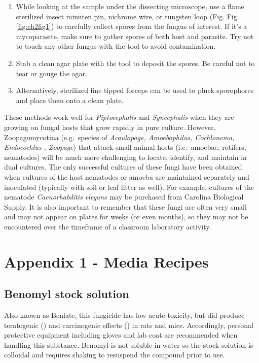 \documentclass[]{book}
\providecommand{\tightlist}{%
  \setlength{\itemsep}{0pt}\setlength{\parskip}{0pt}}
\begin{document}
\begin{enumerate}
\def\labelenumi{\arabic{enumi}.}
\tightlist
\item
  While looking at the sample under the dissecting microscope, use a flame sterilized insect minuten pin, nichrome wire, or tungsten loop (Fig. Fig. \ref{fig:ch2fig1}) to carefully collect spores from the fungus of interest. If it's a mycoparasite, make sure to gather spores of both host and parasite. Try not to touch any other fungus with the tool to avoid contamination.
\item
  Stab a clean agar plate with the tool to deposit the spores. Be careful not to tear or gouge the agar.
\item
  Alternatively, sterilized fine tipped forceps can be used to pluck sporophores and place them onto a clean plate.
\end{enumerate}

These methods work well for \emph{Piptocephalis} and \emph{Syncephalis} when they are growing on fungal hosts that grow rapidly in pure culture. However, Zoopagomycotina (e.g.~species of \emph{Acaulopage, Amoebophilus, Cochlonema, Endocochlus , Zoopage}) that attack small animal hosts (i.e.~amoebae, rotifers, nematodes) will be much more challenging to locate, identify, and maintain in dual cultures. The only successful cultures of these fungi have been obtained when cultures of the host nematodes or amoeba are maintained separately and inoculated (typically with soil or leaf litter as well). For example, cultures of the nematode \emph{Caenorhabditis elegans} may be purchased from Carolina Biological Supply. It is also important to remember that these fungi are often very small and may not appear on plates for weeks (or even months), so they may not be encountered over the timeframe of a classroom laboratory activity.

\hypertarget{appendix-1---media-recipes}{%
\section{Appendix 1 - Media Recipes}\label{appendix-1---media-recipes}}

\hypertarget{benomyl-stock-solution}{%
\subsection{Benomyl stock solution}\label{benomyl-stock-solution}}

Also known as Benlate, this fungicide has low acute toxicity, but did produce teratogenic (\citet{Cummings_1992}) and carcinogenic effects (\citet{NRC_1987}) in rats and mice. Accordingly, personal protective equipment including gloves and lab coat are recommended when handling this substance. Benomyl is not soluble in water so the stock solution is colloidal and requires shaking to resuspend the compound prior to use.
\end{document}
